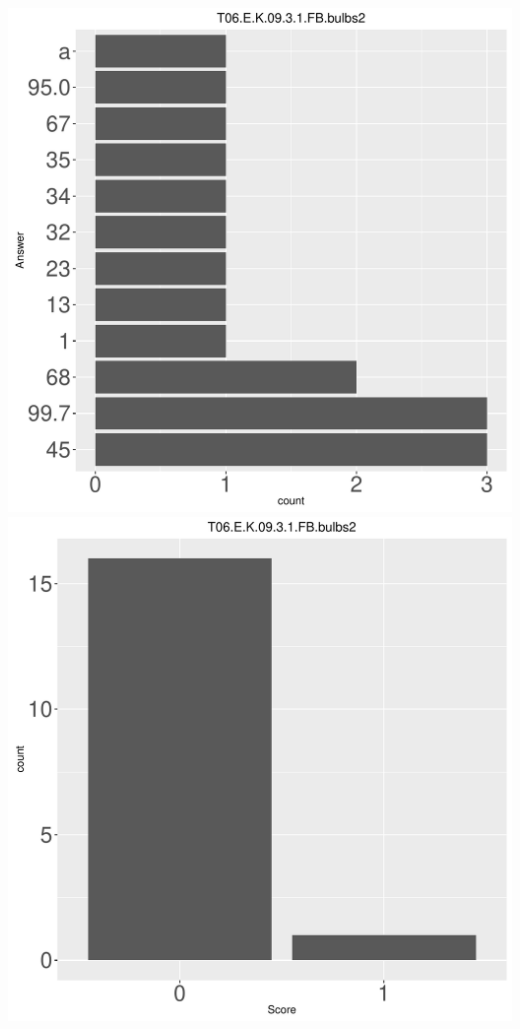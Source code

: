 \documentclass[12pt,english,nohyper]{tufte-handout}\usepackage[]{graphicx}\usepackage[]{color}
\begin{document}
\begin{center} \includegraphics[width=.45\linewidth]{Topic06_AB_34_answer} \includegraphics[width=.45\linewidth]{Topic06_AB_34_score} \end{center} 
\end{document}
